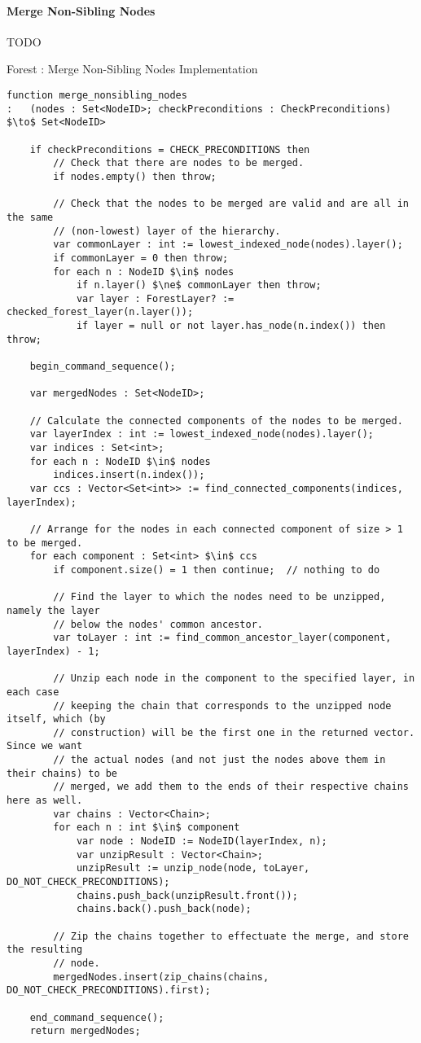 \paragraph{Merge Non-Sibling Nodes}

TODO

\begin{stulisting}[p]
\caption{Forest : Merge Non-Sibling Nodes Implementation}
\label{code:ipfs-forest-mergenonsiblingnodes}
\begin{lstlisting}[style=Default]
function merge_nonsibling_nodes
:	(nodes : Set<NodeID>; checkPreconditions : CheckPreconditions) $\to$ Set<NodeID>

	if checkPreconditions = CHECK_PRECONDITIONS then
		// Check that there are nodes to be merged.
		if nodes.empty() then throw;

		// Check that the nodes to be merged are valid and are all in the same
		// (non-lowest) layer of the hierarchy.
		var commonLayer : int := lowest_indexed_node(nodes).layer();
		if commonLayer = 0 then throw;
		for each n : NodeID $\in$ nodes
			if n.layer() $\ne$ commonLayer then throw;
			var layer : ForestLayer? := checked_forest_layer(n.layer());
			if layer = null or not layer.has_node(n.index()) then throw;

	begin_command_sequence();

	var mergedNodes : Set<NodeID>;

	// Calculate the connected components of the nodes to be merged.
	var layerIndex : int := lowest_indexed_node(nodes).layer();
	var indices : Set<int>;
	for each n : NodeID $\in$ nodes
		indices.insert(n.index());
	var ccs : Vector<Set<int>> := find_connected_components(indices, layerIndex);

	// Arrange for the nodes in each connected component of size > 1 to be merged.
	for each component : Set<int> $\in$ ccs
		if component.size() = 1 then continue;	// nothing to do

		// Find the layer to which the nodes need to be unzipped, namely the layer
		// below the nodes' common ancestor.
		var toLayer : int := find_common_ancestor_layer(component, layerIndex) - 1;

		// Unzip each node in the component to the specified layer, in each case
		// keeping the chain that corresponds to the unzipped node itself, which (by
		// construction) will be the first one in the returned vector. Since we want
		// the actual nodes (and not just the nodes above them in their chains) to be
		// merged, we add them to the ends of their respective chains here as well.
		var chains : Vector<Chain>;
		for each n : int $\in$ component
			var node : NodeID := NodeID(layerIndex, n);
			var unzipResult : Vector<Chain>;
			unzipResult := unzip_node(node, toLayer, DO_NOT_CHECK_PRECONDITIONS);
			chains.push_back(unzipResult.front());
			chains.back().push_back(node);

		// Zip the chains together to effectuate the merge, and store the resulting
		// node.
		mergedNodes.insert(zip_chains(chains, DO_NOT_CHECK_PRECONDITIONS).first);

	end_command_sequence();
	return mergedNodes;
\end{lstlisting}
\end{stulisting}

